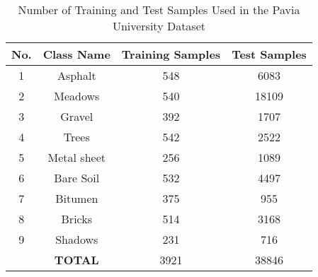 \documentclass[conference]{IEEEtran}
\begin{document}
\begin{table}[htbp]
    \caption{Number of Training and Test Samples Used in the Pavia University Dataset}
    \begin{center}
    \begin{tabular}{cc|cc}
    \hline
    \hline
    \textbf{No.} & \textbf{Class Name}& \textbf{Training Samples}& \textbf{Test Samples} \\
    \hline
    1 & Asphalt        &  548 &  6083 \\
    2 & Meadows        &  540 & 18109 \\
    3 & Gravel         &  392 &  1707 \\
    4 & Trees          &  542 &  2522 \\
    5 & Metal sheet    &  256 &  1089 \\
    6 & Bare Soil      &  532 &  4497 \\
    7 & Bitumen        &  375 &   955 \\
    8 & Bricks         &  514 &  3168 \\
    9 & Shadows        &  231 &   716 \\
    \hline
      & \textbf{TOTAL} & 3921 & 38846 \\
    \hline
    \hline
    \end{tabular}
    \end{center}
    \label{tab:pusample}
    \end{table}
\end{document}
